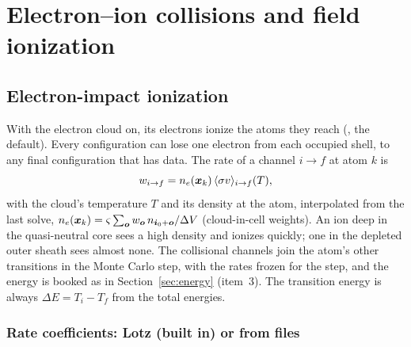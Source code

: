\chapter{Electron--ion collisions and field ionization}
\label{ch:coll}

\section{Electron-impact ionization}

With the electron cloud on, its electrons ionize the atoms they reach (, the default).
Every configuration can lose one electron from each occupied shell, to any final configuration that has data.
The rate of a channel $i\to f$ at atom $k$ is
\begin{equation}
  w_{i\to f} = n_e(\bm{x}_k)\,\langle\sigma v\rangle_{i\to f}(T),
\end{equation}
with the cloud's temperature $T$ and its density at the atom, interpolated from the last solve,
$n_e(\bm{x}_k) = \varsigma\sum_{\bm{o}}w_{\bm{o}}\,n_{\bm{i}_0+\bm{o}}/\Delta V$ (cloud-in-cell weights).
An ion deep in the quasi-neutral core sees a high density and ionizes quickly; one in the depleted outer sheath sees
almost none.
The collisional channels join the atom's other transitions in the Monte Carlo step, with the rates frozen for the
step, and the energy is booked as in Section~\ref{sec:energy} (item~3).
The transition energy is always $\Delta E = T_i - T_f$ from the total energies.

\subsection{Rate coefficients: Lotz (built in) or from files}

